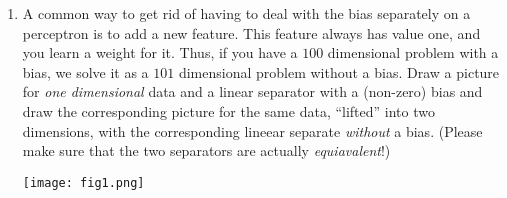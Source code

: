 \documentclass[fleqn]{article}
\begin{document}
\begin{enumerate}
\item A common way to get rid of having to deal with the bias
  separately on a perceptron is to add a new feature.  This feature
  always has value one, and you learn a weight for it.  Thus, if you
  have a $100$ dimensional problem with a bias, we solve it as a $101$
  dimensional problem without a bias.  Draw a picture for \emph{one
    dimensional} data and a linear separator with a (non-zero) bias
  and draw the corresponding picture for the same data, ``lifted''
  into two dimensions, with the corresponding lineear separate
  \emph{without} a bias.  (Please make sure that the two separators
  are actually \emph{equiavalent}!)
\pagebreak
\begin{solution}
\texttt{[image: fig1.png]}
\end{solution}  

\end{enumerate}
\end{document}
